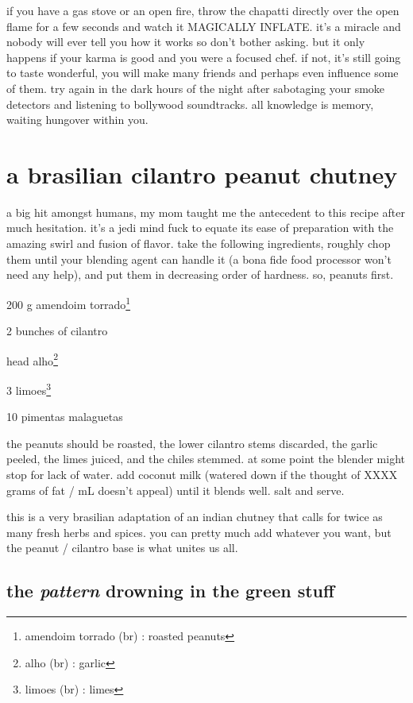 if you have a gas stove or an open fire, throw the chapatti directly over the 
open flame for a few seconds and watch it MAGICALLY INFLATE. it's a miracle and 
nobody will ever tell you how it works so don't bother asking. but it only 
happens if your karma is good and you were a focused chef. if not, it's still 
going to taste wonderful, you will make many friends and perhaps even influence 
some of them. try again in the dark hours of the night after sabotaging your 
smoke detectors and listening to bollywood soundtracks. all knowledge is 
memory, waiting hungover within you.


\section{a brasilian cilantro peanut chutney}

a big hit amongst humans, my mom taught me the antecedent to this recipe after 
much hesitation. it's a jedi mind fuck to equate its ease of preparation with 
the amazing swirl and fusion of flavor. take the following ingredients, roughly 
chop them until your blending agent can handle it (a bona fide food processor 
won't need any help), and put them in decreasing order of hardness. so, peanuts 
first.

\begin{ingredients}
  \item 200 g amendoim torrado\footnote{amendoim torrado (br) :
  roasted peanuts}
  \item 2 bunches of cilantro
  \item \onehalf head alho\footnote{alho (br) : garlic}
  \item 3 limoes\footnote{limoes (br) : limes}
  \item 10 pimentas malaguetas
\end{ingredients}

the peanuts should be roasted, the lower cilantro stems discarded, the garlic 
peeled, the limes juiced, and the chiles stemmed. at some point the blender 
might stop for lack of water. add coconut milk (watered down if the thought of 
XXXX grams of fat / mL doesn't appeal) until it blends well. salt and serve.

this is a very brasilian adaptation of an indian chutney that calls for twice 
as many fresh herbs and spices. you can pretty much add whatever you want, but 
the peanut / cilantro base is what unites us all.

\subsection{the \textit{pattern} drowning in the green stuff}

